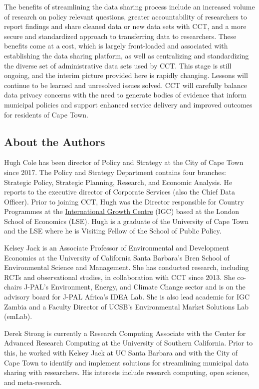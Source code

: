 \documentclass[
]{WileySix}
\begin{document}
The benefits of streamlining the data sharing process include an increased volume of research on policy relevant questions, greater accountability of researchers to report findings and share cleaned data or new data sets with CCT, and a more secure and standardized approach to transferring data to researchers. These benefits come at a cost, which is largely front-loaded and associated with establishing the data sharing platform, as well as centralizing and standardizing the diverse set of administrative data sets used by CCT. This stage is still ongoing, and the interim picture provided here is rapidly changing. Lessons will continue to be learned and unresolved issues solved. CCT will carefully balance data privacy concerns with the need to generate bodies of evidence that inform municipal policies and support enhanced service delivery and improved outcomes for residents of Cape Town.

\hypertarget{about-the-authors-6}{%
\subsection*{About the Authors}\label{about-the-authors-6}}

Hugh Cole has been director of Policy and Strategy at the City of Cape Town since 2017. The Policy and Strategy Department contains four branches: Strategic Policy, Strategic Planning, Research, and Economic Analysis. He reports to the executive director of Corporate Services (also the Chief Data Officer). Prior to joining CCT, Hugh was the Director responsible for Country Programmes at the \href{http://www.theigc.org}{International Growth Centre} (IGC) based at the London School of Economics (LSE). Hugh is a graduate of the University of Cape Town and the LSE where he is Visiting Fellow of the School of Public Policy.

Kelsey Jack is an Associate Professor of Environmental and Development Economics at the University of California Santa Barbara's Bren School of Environmental Science and Management. She has conducted research, including RCTs and observational studies, in collaboration with CCT since 2013. She co-chairs J-PAL's Environment, Energy, and Climate Change sector and is on the advisory board for J-PAL Africa's IDEA Lab. She is also lead academic for IGC Zambia and a Faculty Director of UCSB's Environmental Market Solutions Lab (emLab).

Derek Strong is currently a Research Computing Associate with the Center for Advanced Research Computing at the University of Southern California. Prior to this, he worked with Kelsey Jack at UC Santa Barbara and with the City of Cape Town to identify and implement solutions for streamlining municipal data sharing with researchers. His interests include research computing, open science, and meta-research.
\end{document}
